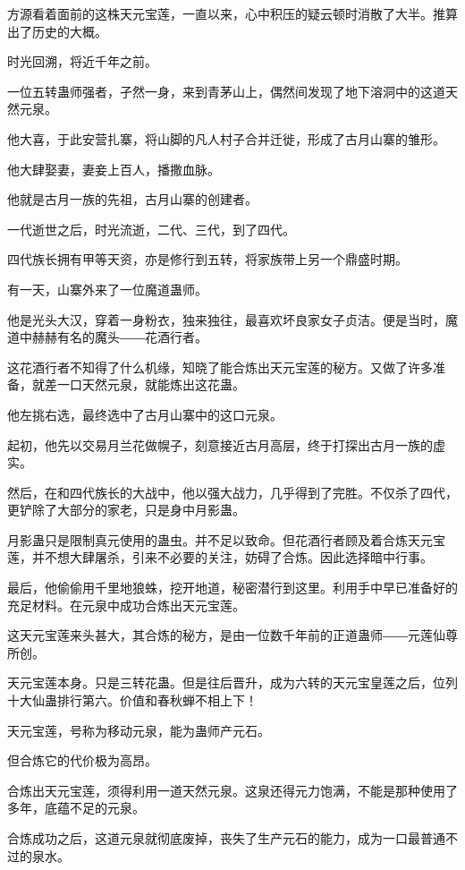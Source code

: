 
\begin{this_body}

方源看着面前的这株天元宝莲，一直以来，心中积压的疑云顿时消散了大半。推算出了历史的大概。

时光回溯，将近千年之前。

一位五转蛊师强者，孑然一身，来到青茅山上，偶然间发现了地下溶洞中的这道天然元泉。

他大喜，于此安营扎寨，将山脚的凡人村子合并迁徙，形成了古月山寨的雏形。

他大肆娶妻，妻妾上百人，播撒血脉。

他就是古月一族的先祖，古月山寨的创建者。

一代逝世之后，时光流逝，二代、三代，到了四代。

四代族长拥有甲等天资，亦是修行到五转，将家族带上另一个鼎盛时期。

有一天，山寨外来了一位魔道蛊师。

他是光头大汉，穿着一身粉衣，独来独往，最喜欢坏良家女子贞洁。便是当时，魔道中赫赫有名的魔头――花酒行者。

这花酒行者不知得了什么机缘，知晓了能合炼出天元宝莲的秘方。又做了许多准备，就差一口天然元泉，就能炼出这花蛊。

他左挑右选，最终选中了古月山寨中的这口元泉。

起初，他先以交易月兰花做幌子，刻意接近古月高层，终于打探出古月一族的虚实。

然后，在和四代族长的大战中，他以强大战力，几乎得到了完胜。不仅杀了四代，更铲除了大部分的家老，只是身中月影蛊。

月影蛊只是限制真元使用的蛊虫。并不足以致命。但花酒行者顾及着合炼天元宝莲，并不想大肆屠杀，引来不必要的关注，妨碍了合炼。因此选择暗中行事。

最后，他偷偷用千里地狼蛛，挖开地道，秘密潜行到这里。利用手中早已准备好的充足材料。在元泉中成功合炼出天元宝莲。

这天元宝莲来头甚大，其合炼的秘方，是由一位数千年前的正道蛊师――元莲仙尊所创。

天元宝莲本身。只是三转花蛊。但是往后晋升，成为六转的天元宝皇莲之后，位列十大仙蛊排行第六。价值和春秋蝉不相上下！

天元宝莲，号称为移动元泉，能为蛊师产元石。

但合炼它的代价极为高昂。

合炼出天元宝莲，须得利用一道天然元泉。这泉还得元力饱满，不能是那种使用了多年，底蕴不足的元泉。

合炼成功之后，这道元泉就彻底废掉，丧失了生产元石的能力，成为一口最普通不过的泉水。


\end{this_body}
